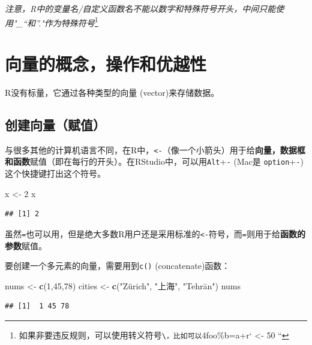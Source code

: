 \documentclass[]{book}
\newenvironment{Shaded}{\begin{snugshade}}{\end{snugshade}}
\newcommand{\DecValTok}[1]{\textcolor[rgb]{0.00,0.00,0.81}{#1}}
\newcommand{\KeywordTok}[1]{\textcolor[rgb]{0.13,0.29,0.53}{\textbf{#1}}}
\newcommand{\NormalTok}[1]{#1}
\newcommand{\StringTok}[1]{\textcolor[rgb]{0.31,0.60,0.02}{#1}}
\let\rmarkdownfootnote\footnote%
\def\footnote{\protect\rmarkdownfootnote}
\begin{document}
\emph{注意，R中的变量名/自定义函数名不能以数字和特殊符号开头，中间只能使用"\_``和''."作为特殊符号}\footnote{如果非要违反规则，可以使用转义符号\texttt{\textbackslash{}\textasciigrave{}\textasciigrave{}，比如可以\textasciigrave{}\textasciigrave{}}4foo\%b=a+r` \textless{}- 50 ``}

\section{向量的概念，操作和优越性}

R没有标量，它通过各种类型的向量 (vector)来存储数据。

\hypertarget{create-vector}{%
\subsection{创建向量（赋值）}\label{create-vector}}

与很多其他的计算机语言不同，在R中，\texttt{\textless{}-}（像一个小箭头）用于给\textbf{向量，数据框和函数}赋值（即在每行的开头）。在RStudio中，可以用\texttt{Alt}+\texttt{-} (Mac是 \texttt{option}+\texttt{-}) 这个快捷键打出这个符号。

\begin{Shaded}
\begin{Highlighting}[]
\NormalTok{x <-}\StringTok{ }\DecValTok{2}
\NormalTok{x}
\end{Highlighting}
\end{Shaded}

\begin{verbatim}
## [1] 2
\end{verbatim}

虽然\texttt{=}也可以用，但是绝大多数R用户还是采用标准的\texttt{\textless{}-}符号，而\texttt{=}则用于给\textbf{函数的参数}赋值。

要创建一个多元素的向量，需要用到\texttt{c()} (concatenate)函数：

\begin{Shaded}
\begin{Highlighting}[]
\NormalTok{nums <-}\StringTok{ }\KeywordTok{c}\NormalTok{(}\DecValTok{1}\NormalTok{,}\DecValTok{45}\NormalTok{,}\DecValTok{78}\NormalTok{)}
\NormalTok{cities <-}\StringTok{ }\KeywordTok{c}\NormalTok{(}\StringTok{"Zürich", "}\NormalTok{上海}\StringTok{", "}\NormalTok{Tehrān}\StringTok{")}
\StringTok{nums}
\end{Highlighting}
\end{Shaded}

\begin{verbatim}
## [1]  1 45 78
\end{verbatim}
\end{document}
